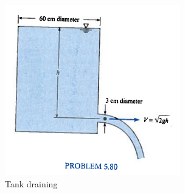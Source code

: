 \documentclass[12pt]{article}
\begin{document}
\begin{enumerate}
\begin{figure}[h!] %
   \centering
   \includegraphics[width=3in]{Time2Drain.jpg} 
   \caption{Tank draining}
   \label{fig:Time2Drain}
\end{figure}

\end{enumerate}
\end{document}
